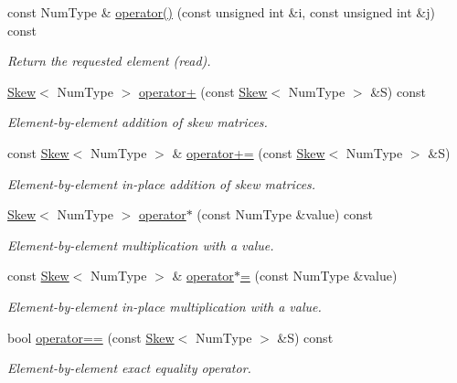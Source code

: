 \begin{DoxyCompactItemize}
const Num\+Type \& \hyperlink{singletonscrews_1_1_skew_a8eb6fd75d9231864e13768962007afda}{operator()} (const unsigned int \&i, const unsigned int \&j) const 
\begin{DoxyCompactList}\small\item\em Return the requested element (read). \end{DoxyCompactList}\item 
\hyperlink{singletonscrews_1_1_skew}{Skew}$<$ Num\+Type $>$ \hyperlink{singletonscrews_1_1_skew_a470218d531800781050e50c55078a565}{operator+} (const \hyperlink{singletonscrews_1_1_skew}{Skew}$<$ Num\+Type $>$ \&S) const 
\begin{DoxyCompactList}\small\item\em Element-\/by-\/element addition of skew matrices. \end{DoxyCompactList}\item 
const \hyperlink{singletonscrews_1_1_skew}{Skew}$<$ Num\+Type $>$ \& \hyperlink{singletonscrews_1_1_skew_a867c32141fb11e771f31072b6a7a9ab1}{operator+=} (const \hyperlink{singletonscrews_1_1_skew}{Skew}$<$ Num\+Type $>$ \&S)
\begin{DoxyCompactList}\small\item\em Element-\/by-\/element in-\/place addition of skew matrices. \end{DoxyCompactList}\item 
\hyperlink{singletonscrews_1_1_skew}{Skew}$<$ Num\+Type $>$ \hyperlink{singletonscrews_1_1_skew_afcea925bac6a79b527252cabe4ee5f8c}{operator$\ast$} (const Num\+Type \&value) const 
\begin{DoxyCompactList}\small\item\em Element-\/by-\/element multiplication with a value. \end{DoxyCompactList}\item 
const \hyperlink{singletonscrews_1_1_skew}{Skew}$<$ Num\+Type $>$ \& \hyperlink{singletonscrews_1_1_skew_a571df087bba75da0a6d5460a16cb67f3}{operator$\ast$=} (const Num\+Type \&value)
\begin{DoxyCompactList}\small\item\em Element-\/by-\/element in-\/place multiplication with a value. \end{DoxyCompactList}\item 
bool \hyperlink{singletonscrews_1_1_skew_a5ef9a9998496f77ce6e52d82718265c6}{operator==} (const \hyperlink{singletonscrews_1_1_skew}{Skew}$<$ Num\+Type $>$ \&S) const 
\begin{DoxyCompactList}\small\item\em Element-\/by-\/element exact equality operator. \end{DoxyCompactList}\item 

\end{DoxyCompactItemize}
